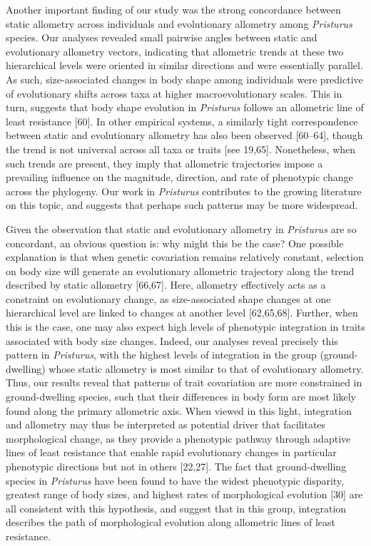 \documentclass[
  11pt,
]{article}
\begin{document}
Another important finding of our study was the strong concordance
between static allometry across individuals and evolutionary allometry
among \emph{Pristurus} species. Our analyses revealed small pairwise
angles between static and evolutionary allometry vectors, indicating
that allometric trends at these two hierarchical levels were oriented in
similar directions and were essentially parallel. As such,
size-associated changes in body shape among individuals were predictive
of evolutionary shifts across taxa at higher macroevolutionary scales.
This in turn, suggests that body shape evolution in \emph{Pristurus}
follows an allometric line of least resistance {[}60{]}. In other
empirical systems, a similarly tight correspondence between static and
evolutionary allometry has also been observed {[}60--64{]}, though the
trend is not universal across all taxa or traits {[}see 19,65{]}.
Nonetheless, when such trends are present, they imply that allometric
trajectories impose a prevailing influence on the magnitude, direction,
and rate of phenotypic change across the phylogeny. Our work in
\emph{Pristurus} contributes to the growing literature on this topic,
and suggests that perhaps such patterns may be more
widespread.\hfill\break

Given the observation that static and evolutionary allometry in
\emph{Pristurus} are so concordant, an obvious question is: why might
this be the case? One possible explanation is that when genetic
covariation remains relatively constant, selection on body size will
generate an evolutionary allometric trajectory along the trend described
by static allometry {[}66,67{]}. Here, allometry effectively acts as a
constraint on evolutionary change, as size-associated shape changes at
one hierarchical level are linked to changes at another level
{[}62,65,68{]}. Further, when this is the case, one may also expect high
levels of phenotypic integration in traits associated with body size
changes. Indeed, our analyses reveal precisely this pattern in
\emph{Pristurus}, with the highest levels of integration in the group
(ground-dwelling) whose static allometry is most similar to that of
evolutionary allometry. Thus, our results reveal that patterns of trait
covariation are more constrained in ground-dwelling species, such that
their differences in body form are most likely found along the primary
allometric axis. When viewed in this light, integration and allometry
may thus be interpreted as potential driver that facilitates
morphological change, as they provide a phenotypic pathway through
adaptive lines of least resistance that enable rapid evolutionary
changes in particular phenotypic directions but not in others
{[}22,27{]}. The fact that ground-dwelling species in \emph{Pristurus}
have been found to have the widest phenotypic disparity, greatest range
of body sizes, and highest rates of morphological evolution {[}30{]} are
all consistent with this hypothesis, and suggest that in this group,
integration describes the path of morphological evolution along
allometric lines of least resistance. \hfill\break
\end{document}
